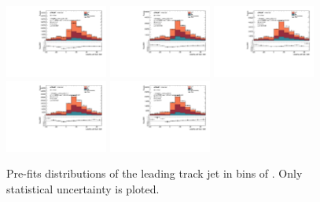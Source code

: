 \clearpage
\subsection{\mpt}

\begin{figure}[htbp]
  \centering
 \includegraphics[width=0.3\textwidth]{figures/gbb/Sub_Sd0_Fits/Canv_PreFit_-3-logM_bb_over_p_TG--22_LpT_INF_SpT_INF_coarse_x.pdf}
 \includegraphics[width=0.3\textwidth]{figures/gbb/Sub_Sd0_Fits/Canv_PreFit_-22-logM_bb_over_p_TG--19_LpT_INF_SpT_INF_coarse_x.pdf}
 \includegraphics[width=0.3\textwidth]{figures/gbb/Sub_Sd0_Fits/Canv_PreFit_-19-logM_bb_over_p_TG--15_LpT_INF_SpT_INF_coarse_x.pdf}\\
 \includegraphics[width=0.3\textwidth]{figures/gbb/Sub_Sd0_Fits/Canv_PreFit_-15-logM_bb_over_p_TG--11_LpT_INF_SpT_INF_coarse_x.pdf}
 \includegraphics[width=0.3\textwidth]{figures/gbb/Sub_Sd0_Fits/Canv_PreFit_-11-logM_bb_over_p_TG-0_LpT_INF_SpT_INF_coarse_x.pdf}

\caption{Pre-fits \subsdzero distributions of the leading track jet in bins of \mpt. Only statistical uncertainty is ploted.}
  \label{fig:fracmasspt-prefits-leading-sub}
\end{figure}


